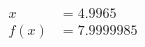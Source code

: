 \documentclass[preview]{standalone}
\begin{document}
\begin{align*}
x &= 4.9965\\f(x) &= 7.9999985
\end{align*}
\end{document}
